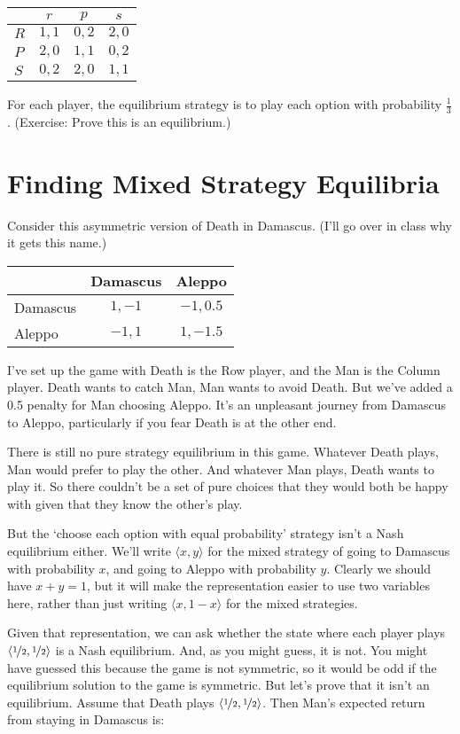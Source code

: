 \documentclass[11pt,]{article}
\begin{document}
\begin{longtable}[]{@{}lccc@{}}
\toprule
& \(r\) & \(p\) & \(s\)\tabularnewline
\midrule
\endhead
\(R\) & \(1,1\) & \(0,2\) & \(2,0\)\tabularnewline
\(P\) & \(2,0\) & \(1,1\) & \(0,2\)\tabularnewline
\(S\) & \(0,2\) & \(2,0\) & \(1,1\)\tabularnewline
\bottomrule
\end{longtable}

For each player, the equilibrium strategy is to play each option with
probability \(\frac{1}{3}\). (Exercise: Prove this is an equilibrium.)

\hypertarget{finding-mixed-strategy-equilibria}{%
\section{Finding Mixed Strategy
Equilibria}\label{finding-mixed-strategy-equilibria}}

Consider this asymmetric version of Death in Damascus. (I'll go over in
class why it gets this name.)

\begin{longtable}[]{@{}lcc@{}}
\toprule
& Damascus & Aleppo\tabularnewline
\midrule
\endhead
Damascus & \(1, -1\) & \(-1,0.5\)\tabularnewline
Aleppo & \(-1,1\) & \(1,-1.5\)\tabularnewline
\bottomrule
\end{longtable}

I've set up the game with Death is the Row player, and the Man is the
Column player. Death wants to catch Man, Man wants to avoid Death. But
we've added a 0.5 penalty for Man choosing Aleppo. It's an unpleasant
journey from Damascus to Aleppo, particularly if you fear Death is at
the other end.

There is still no pure strategy equilibrium in this game. Whatever Death
plays, Man would prefer to play the other. And whatever Man plays, Death
wants to play it. So there couldn't be a set of pure choices that they
would both be happy with given that they know the other's play.

But the `choose each option with equal probability' strategy isn't a
Nash equilibrium either. We'll write \(\langle x, y \rangle\) for the
mixed strategy of going to Damascus with probability \(x\), and going to
Aleppo with probability \(y\). Clearly we should have \(x + y = 1\), but
it will make the representation easier to use two variables here, rather
than just writing \(\langle x, 1-x \rangle\) for the mixed strategies.

Given that representation, we can ask whether the state where each
player plays \(\langle \nicefrac{1}{2}, \nicefrac{1}{2} \rangle\) is a
Nash equilibrium. And, as you might guess, it is not. You might have
guessed this because the game is not symmetric, so it would be odd if
the equilibrium solution to the game is symmetric. But let's prove that
it isn't an equilibrium. Assume that Death plays
\(\langle \nicefrac{1}{2}, \nicefrac{1}{2} \rangle\). Then Man's
expected return from staying in Damascus is:
\end{document}

